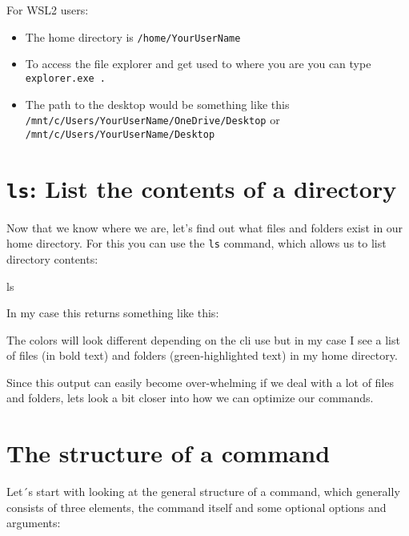 \documentclass[
  letterpaper,
  DIV=11,
  numbers=noendperiod]{scrreprt}
\newenvironment{Shaded}{}{}
\newcommand{\FunctionTok}[1]{\textcolor[rgb]{0.44,0.26,0.76}{#1}}
\providecommand{\tightlist}{%
  \setlength{\itemsep}{0pt}\setlength{\parskip}{0pt}}\usepackage{longtable,booktabs,array}
\begin{document}
\begin{tcolorbox}
For WSL2 users:

\begin{itemize}
\tightlist
\item
  The home directory is \texttt{/home/YourUserName}
\item
  To access the file explorer and get used to where you are you can type
  \texttt{explorer.exe\ .}
\item
  The path to the desktop would be something like this
  \texttt{/mnt/c/Users/YourUserName/OneDrive/Desktop} or
  \texttt{/mnt/c/Users/YourUserName/Desktop}
\end{itemize}

\end{tcolorbox}

\section{\texorpdfstring{\texttt{ls}: List the contents of a
directory}{ls: List the contents of a directory}}\label{ls-list-the-contents-of-a-directory}

Now that we know where we are, let's find out what files and folders
exist in our home directory. For this you can use the \texttt{ls}
command, which allows us to list directory contents:

\begin{Shaded}
\begin{Highlighting}[]
\FunctionTok{ls}
\end{Highlighting}
\end{Shaded}

In my case this returns something like this:

The colors will look different depending on the cli use but in my case I
see a list of files (in bold text) and folders (green-highlighted text)
in my home directory.

Since this output can easily become over-whelming if we deal with a lot
of files and folders, lets look a bit closer into how we can optimize
our commands.

\section{The structure of a command}\label{the-structure-of-a-command}

Let´s start with looking at the general structure of a command, which
generally consists of three elements, the command itself and some
optional options and arguments:
\end{document}
